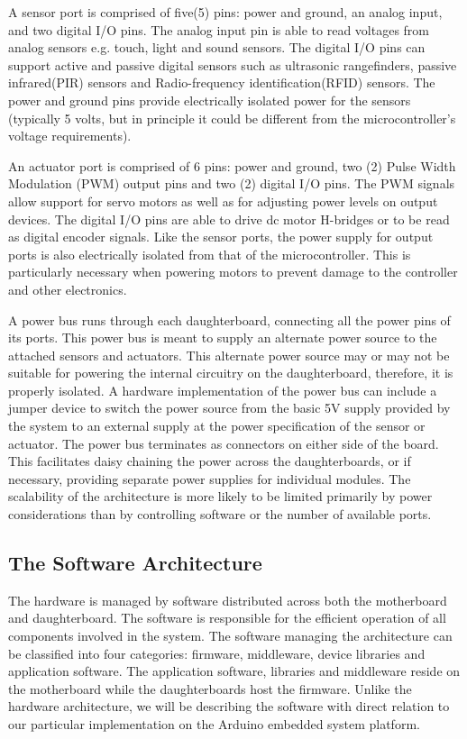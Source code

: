  A sensor port is comprised of five(5) pins: power and ground, an analog input, and two digital I/O pins. The analog input pin is able to read voltages from analog sensors e.g. touch, light and sound sensors. The digital I/O pins can support active and passive digital sensors such as ultrasonic rangefinders,  passive infrared(PIR) sensors and Radio-frequency identification(RFID) sensors. The power and ground pins provide electrically isolated power for the sensors (typically 5 volts, but in principle it could be different from the microcontroller's voltage requirements).

An actuator port is comprised of 6 pins: power and ground, two (2) Pulse Width Modulation (PWM) output pins and two (2) digital I/O pins. The PWM signals allow support for servo motors as well as for adjusting power levels on output devices. The digital I/O pins are able to drive dc motor H-bridges or to be read as digital encoder signals. Like the sensor ports, the power supply for output ports is also electrically isolated from that of the microcontroller. This is particularly necessary when powering motors to prevent damage to the controller and other electronics.

A power bus runs through each daughterboard, connecting all the power pins of its ports. This power bus is meant to supply an alternate power source to the attached sensors and actuators. This alternate power source may or may not be suitable for powering the internal circuitry on the daughterboard, therefore, it is properly isolated. A hardware implementation of the power bus can include a jumper device to switch the power source from the basic 5V supply provided by the system to an external supply at the power specification of the sensor or actuator. The power bus terminates as connectors on either side of the board. This facilitates daisy chaining the power across the daughterboards, or if necessary, providing separate power supplies for individual modules. The scalability of the \xten architecture is more likely to be limited primarily by power considerations than by controlling software or the number of available ports.
\newpage

\subsection{The Software Architecture} %
\label{sub:the_software_architecture}
The \xten hardware is managed by software distributed across both the motherboard and daughterboard. The software is responsible for the efficient operation of all components involved in the system. The software managing the architecture can be classified into four categories: firmware, middleware, device libraries and application software. The application software, libraries and middleware reside on the motherboard while the daughterboards host the firmware. Unlike the hardware architecture, we will be describing the software with direct relation to our particular implementation on the Arduino embedded system platform.
	


